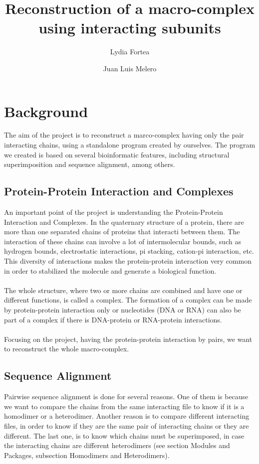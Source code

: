 \documentclass[a4paper,12pt]{report}
\title{Reconstruction of a macro-complex using interacting subunits}
\author{Lydia Fortea \and Juan Luis Melero}
\date{}
\begin{document}
\maketitle
\tableofcontents{}

\chapter{Background}

The aim of the project is to reconstruct a marco-complex having only the pair interacting chains, using a standalone program created by ourselves.
The program we created is based on several bioinformatic features, including structural superimposition and sequence alignment, among others.

\section{Protein-Protein Interaction and Complexes}

An important point of the project is understanding the Protein-Protein Interaction and Complexes. In the quaternary structure of a protein, there are more than one separated chains of proteins that interacti between them.
The interaction of these chains can involve a lot of intermolecular bounds, such as hydrogen bounds, electrostatic interactions, pi stacking, cation-pi interaction, etc. This diversity of interactions makes the protein-protein interaction
very common in order to stabilized the molecule and generate a biological function.\\\\
The whole structure, where two or more chains are combined and have one or different functions, is called a complex. The formation of a complex can be made by protein-protein interaction only or nucleotides (DNA or RNA) can also be part of a complex if there is DNA-protein or RNA-protein interactions.\\\\
Focusing on the project, having the protein-protein interaction by pairs, we want to reconstruct the whole macro-complex.

\section{Sequence Alignment}

Pairwise sequence alignment is done for several reasons. One of them is because we want to compare the chains from the same interacting file to know if it is a homodimer or a heterodimer. Another reason is to compare different interacting files, in order to know if they are the same pair of interacting chains or they are different. The last one, is to know which chains must be superimposed, in case the interacting chains are different heterodimers (see section Modules and Packages, subsection Homodimers and Heterodimers).
\end{document}
